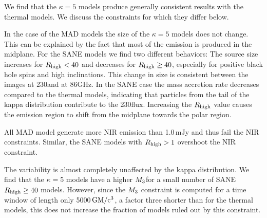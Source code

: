 We find that the $\kappa=5$ models produce generally consistent results with the \bhac thermal models. We discuss the constraints for which they differ below.

In the case of the MAD models the size of the $\kappa=5$ models does not change. This can be explained by the fact that most of the emission is produced in the midplane. For the SANE models we find two different behaviors: The source size increases for $R_{\rm high}<40$ and decreases for $R_{\rm high}\geq 40$, especially for positive black hole spins and high inclinations. This change in size is consistent between the images at 230\GHz and at 86GHz. In the SANE case the mass accretion rate decreases compared to the thermal models, indicating that particles from the tail of the kappa distribution contribute to the 230\GHz flux. Increasing the $R_{\rm high}$ value causes the emission region to shift from the midplane towards the polar region.




All MAD model generate more NIR emission than 1.0\,mJy and thus fail the NIR constraints. Similar, the SANE models with $R_{\rm high}>1$ overshoot the NIR constraint.


The variability is almost completely unaffected by the kappa distribution. We find that the $\kappa=5$ models have a higher $M_{3}$for a small number of SANE $R_{\rm high}\geq 40$ models. However, since the $M_{3}$ constraint is computed for a time window of length only 5000\,$\rm{GM/c^3}$, a factor three shorter than for the thermal models, this does not increase the fraction of models ruled out by this constraint.


